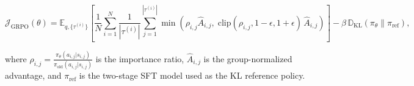 {\small
\begin{equation}
\mathcal{J}_{\text{GRPO}}(\theta) = \mathbb{E}_{q,\{\tau^{(i)}\}} \left[
  \frac{1}{N} \sum_{i=1}^{N} \frac{1}{|\tau^{(i)}|}
  \sum_{j=1}^{|\tau^{(i)}|}
  \min\!\left( \rho_{i,j} \hat{A}_{i,j},\;
  \mathrm{clip}(\rho_{i,j}, 1-\epsilon , 1+\epsilon)\, \hat{A}_{i,j} \right)
\right] - \beta\,\mathbb{D}_{\mathrm{KL}}(\pi_\theta \| \pi_{\text{ref}}),
\label{eq:grpo}
\end{equation}
}

where $\rho_{i,j}=\frac{\pi_\theta(a_{i,j}|s_{i,j})}{\pi_{\text{old}}(a_{i,j}|s_{i,j})}$ 
is the importance ratio, $\hat{A}_{i,j}$ is the group-normalized 
advantage, and $\pi_{\text{ref}}$ is the two-stage SFT model used as the KL reference policy.


